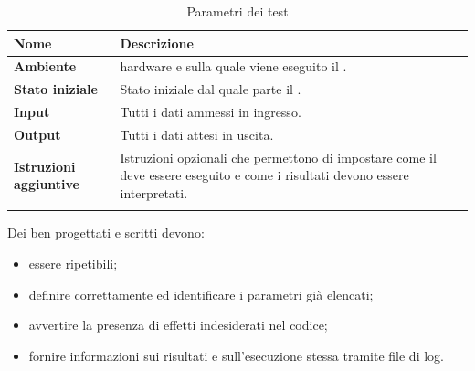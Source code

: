 {{\setlength{\freewidth}{\dimexpr\textwidth-0\tabcolsep}
	\renewcommand{\arraystretch}{1.5}
	\setlength{\aboverulesep}{0pt}
	\setlength{\belowrulesep}{0pt}
	\begin{longtable}{L{.210\freewidth} L{.6\freewidth} L{.080\freewidth}}
		\textbf{Nome} & \textbf{Descrizione} \\
		\toprule
		\endhead		
		\textbf{Ambiente} &  hardware e  sulla quale viene eseguito il . \\
		\textbf{Stato iniziale} & Stato iniziale dal quale parte il . \\
		 \textbf{Input} & Tutti i dati ammessi in ingresso. \\
		\textbf{Output} & Tutti i dati attesi in uscita. \\
		 \textbf{Istruzioni aggiuntive} & Istruzioni opzionali che permettono di impostare come il  deve essere eseguito e come i risultati devono essere interpretati. \\
		\bottomrule
		\hiderowcolors
		\caption{Parametri dei test}
	\end{longtable}


Dei  ben progettati e scritti devono:
\begin{itemize}
	\item essere ripetibili;
	\item definire correttamente ed identificare i parametri già elencati;
	\item avvertire la presenza di effetti indesiderati nel codice;
	\item fornire informazioni sui risultati e sull'esecuzione stessa tramite file di log.
\end{itemize}

}}
